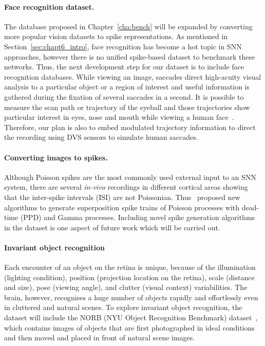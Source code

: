 \paragraph{Face recognition dataset.}
The database proposed in Chapter~\ref{cha:bench} will be expanded by converting more popular vision datasets to spike representations.
As mentioned in Section~\ref{sec:chapt6_intro}, face recognition has become a hot topic in SNN approaches, however there is no unified spike-based dataset to benchmark these networks.
Thus, the next development step for our dataset is to include face recognition databases.
While viewing an image, saccades direct high-acuity visual analysis to a particular object or a region of interest and useful information is gathered during the fixation of several saccades in a second.
It is possible to measure the scan path or trajectory of the eyeball and those trajectories show particular interest in eyes, nose and mouth while viewing a human face~\citep{yarbus1967eye}.
Therefore, our plan is also to embed modulated trajectory information to direct the recording using DVS sensors to simulate human saccades.

\paragraph{Converting images to spikes.}
Although Poisson spikes are the most commonly used external input to an SNN system, there are several \textit{in-vivo} recordings in different cortical areas showing that the inter-spike intervals (ISI) are not Poissonian. 
Thus~\citet{deger2012statistical} proposed new algorithms to generate superposition spike trains of Poisson processes with dead-time (PPD) and Gamma processes.
Including novel spike generation algorithms in the dataset is one aspect of future work which will be carried out.

\paragraph{Invariant object recognition}
Each encounter of an object on the retina is unique, because of the illumination (lighting condition), position (projection location on the retina), scale (distance and size), pose (viewing angle), and clutter (visual context) variabilities.
The brain, however, recognises a huge number of objects rapidly and effortlessly even in cluttered and natural scenes.
To explore invariant object recognition, the dataset will include the NORB (NYU Object Recognition Benchmark) dataset~\citep{lecun2004learning}, which contains images of objects that are first photographed in ideal conditions and then moved and placed in front of natural scene images.

